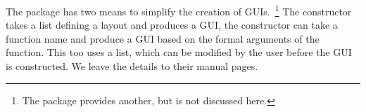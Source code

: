 The  package has two means to simplify the creation of
GUIs.~\footnote{The  package provides another, but is not
  discussed here.} The  constructor takes a list defining a
layout and produces a GUI, the  constructor can
take a function name and produce a GUI based on the formal arguments
of the function. This too uses a list, which can be modified by the
user before the GUI is constructed. We leave the details to their
manual pages.










